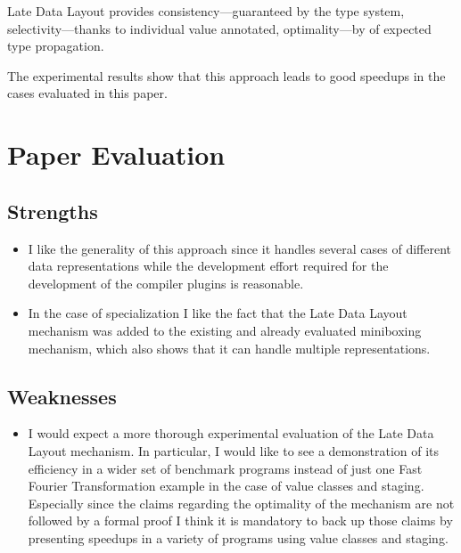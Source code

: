 \documentclass{article} \usepackage{hyperref} \usepackage{graphicx}
\begin{document}
Late Data Layout provides consistency---guaranteed by the type system,
selectivity---thanks to individual value annotated, optimality---by of
expected type propagation.

The experimental results show that this approach leads to good
speedups in the cases evaluated in this paper.

\section{Paper Evaluation}
\subsection{Strengths}
\begin{itemize}
\item I like the generality of this approach since it handles several
cases of different data representations while the development effort
required for the development of the compiler plugins is reasonable.

\item In the case of specialization I like the fact that the Late Data
Layout mechanism was added to the existing and already evaluated
miniboxing mechanism, which also shows that it can handle multiple
representations.
\end{itemize}

\subsection{Weaknesses}
\begin{itemize}
\item I would expect a more thorough experimental evaluation of the
Late Data Layout mechanism. In particular, I would like to see a
demonstration of its efficiency in a wider set of benchmark programs
instead of just one Fast Fourier Transformation example in the case of
value classes and staging. Especially since the claims regarding the
optimality of the mechanism are not followed by a formal proof I think
it is mandatory to back up those claims by presenting speedups in a
variety of programs using value classes and staging.
\end{itemize}
\end{document}

